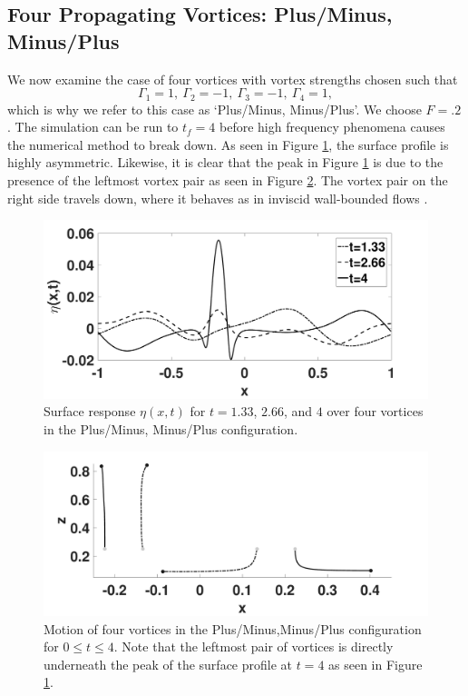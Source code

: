 \documentclass[a4paper,11pt]{article}
\begin{document}
\subsection{Four Propagating Vortices: Plus/Minus, Minus/Plus}
We now examine the case of four vortices with vortex strengths chosen such that
\[
\Gamma_{1}=1, ~ \Gamma_{2}=-1, ~ \Gamma_{3}=-1,~\Gamma_{4}=1,
\]
which is why we refer to this case as `Plus/Minus, Minus/Plus'.  We choose $F=.2$.  The simulation can be run to $t_{f}=4$ before high frequency phenomena causes the numerical method to break down.  As seen in Figure \ref{fig:surfreppmmp}, the surface profile is highly asymmetric.  Likewise, it is clear that the peak in Figure \ref{fig:surfreppmmp} is due to the presence of the leftmost vortex pair as seen in Figure \ref{fig:trackpmmp}.  The vortex pair on the right side travels down, where it behaves as in inviscid wall-bounded flows \cite{lamb}.   
\begin{figure}[!h]
\centering
\includegraphics[width=.75\textwidth]{surf_resp_mu_pt2_F_pt2_pmmp}
\caption{Surface response $\eta(x,t)$ for $t=1.33$, $2.66$, and $4$ over four vortices in the Plus/Minus, Minus/Plus configuration.}
\label{fig:surfreppmmp}
\end{figure}
\begin{figure}[!h]
\centering
\includegraphics[width=.75\textwidth]{tracks_F_pt2_tf_4_pmmp}
\caption{Motion of four vortices in the Plus/Minus,Minus/Plus configuration for $0\leq t \leq 4$.  Note that the leftmost pair of vortices is directly underneath the peak of the surface profile at $t=4$ as seen in Figure \ref{fig:surfreppmmp}.}
\label{fig:trackpmmp}
\end{figure}
\end{document}
